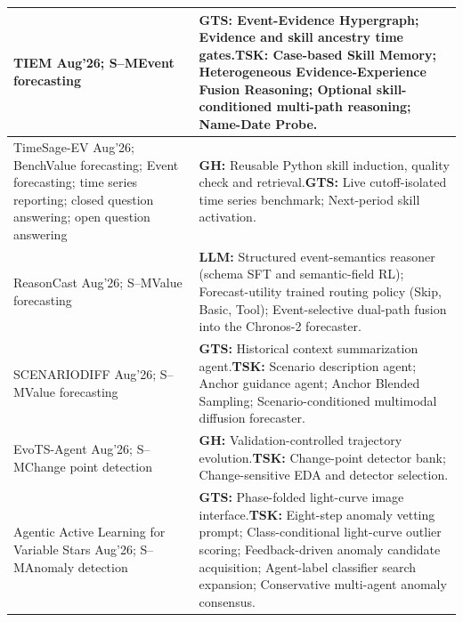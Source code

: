 \documentclass[preprints,article,submit,moreauthors]{Definitions/mdpi}
\newcommand{\typeSMshort}{\textsf{S--M}}
\newcommand{\typeBenchshort}{\textsf{Bench}}
\begin{document}
\begin{longtable}{@{}>{\raggedright\arraybackslash}p{}p{}@{}}
TIEM \citep{tiem2026} Aug'26; \typeSMshort{}\newline Event forecasting & \textbf{GTS:} Event-Evidence Hypergraph; Evidence and skill ancestry time gates.\newline\textbf{TSK:} Case-based Skill Memory; Heterogeneous Evidence-Experience Fusion Reasoning; Optional skill-conditioned multi-path reasoning; Name-Date Probe.\\\midrule
TimeSage-EV \citep{timesageev2026} Aug'26; \typeBenchshort{}\newline Value forecasting; Event forecasting; time series reporting; closed question answering; open question answering & \textbf{GH:} Reusable Python skill induction, quality check and retrieval.\newline\textbf{GTS:} Live cutoff-isolated time series benchmark; Next-period skill activation.\\\midrule
ReasonCast \citep{reasoncast2026} Aug'26; \typeSMshort{}\newline Value forecasting & \textbf{LLM:} Structured event-semantics reasoner (schema SFT and semantic-field RL); Forecast-utility trained routing policy (Skip, Basic, Tool); Event-selective dual-path fusion into the Chronos-2 forecaster.\\\midrule
SCENARIODIFF \citep{scenariodiff2026} Aug'26; \typeSMshort{}\newline Value forecasting & \textbf{GTS:} Historical context summarization agent.\newline\textbf{TSK:} Scenario description agent; Anchor guidance agent; Anchor Blended Sampling; Scenario-conditioned multimodal diffusion forecaster.\\\midrule
EvoTS-Agent \citep{evotsagent2026} Aug'26; \typeSMshort{}\newline Change point detection & \textbf{GH:} Validation-controlled trajectory evolution.\newline\textbf{TSK:} Change-point detector bank; Change-sensitive EDA and detector selection.\\\midrule
Agentic Active Learning for Variable Stars \citep{agenticactivelearning2026} Aug'26; \typeSMshort{}\newline Anomaly detection & \textbf{GTS:} Phase-folded light-curve image interface.\newline\textbf{TSK:} Eight-step anomaly vetting prompt; Class-conditional light-curve outlier scoring; Feedback-driven anomaly candidate acquisition; Agent-label classifier search expansion; Conservative multi-agent anomaly consensus.\\\midrule

\end{longtable}
\end{document}
